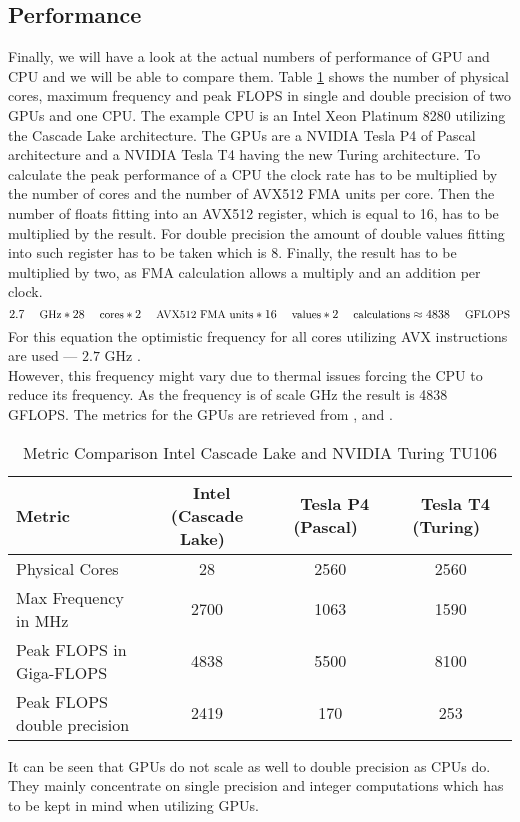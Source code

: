 \subsection{Performance}
  Finally, we will have a look at the actual numbers of performance of GPU and CPU and we will be able to compare them.
  Table \ref{tab:comp} shows the number of physical cores, maximum frequency and peak FLOPS in single and double precision of two GPUs and one CPU.
  The example CPU is an Intel Xeon Platinum 8280 utilizing the Cascade Lake architecture.
  The GPUs are a NVIDIA Tesla P4 of Pascal architecture and a NVIDIA Tesla T4 having the new Turing architecture.
  To calculate the peak performance of a CPU the clock rate has to be multiplied by the number of cores and the number of AVX512 FMA units per core.
  Then the number of floats fitting into an AVX512 register, which is equal to 16, has to be multiplied by the result.
  For double precision the amount of double values fitting into such register has to be taken which is 8.
  Finally, the result has to be multiplied by two, as FMA calculation allows a multiply and an addition per clock.
  \[2.7 \textrm{\small{ GHz}} * 28 \textrm{\small{ cores}} * 2 \textrm{\small{ AVX512 FMA units}} * 16 \textrm{\small{ values}} * 2 \textrm{\small{ calculations}} \approx 4838 \textrm{\small{ GFLOPS}}\]
  For this equation the optimistic frequency for all cores utilizing AVX instructions are used --- \(2.7\) GHz \cite{Microway}.\\
  However, this frequency might vary due to thermal issues forcing the CPU to reduce its frequency.
  As the frequency is of scale GHz the result is 4838 GFLOPS.
  The metrics for the GPUs are retrieved from \cite{NVIDIA.2018}, \cite{Keny2019} and \cite{GPZOO}.
  
\begin{table}[htbp]
  \centering
  \caption{Metric Comparison Intel Cascade Lake and NVIDIA Turing TU106}
  \label{tab:comp}
  \begin{tabular}{|l|c|c|c|}
    \hline
	\textbf{Metric} & \textbf{~Intel (Cascade Lake)~} & \textbf{~Tesla P4 (Pascal)~} & \textbf{~Tesla T4 (Turing)~} \\\hline
	Physical Cores & 28 & 2560 & 2560 \\\hline
	Max Frequency in MHz & 2700 & 1063 & 1590 \\\hline
	Peak FLOPS in Giga-FLOPS & 4838 & 5500 & 8100 \\\hline
	Peak FLOPS double precision & 2419 & 170 & 253 \\\hline
  \end{tabular}
\end{table}

  It can be seen that GPUs do not scale as well to double precision as CPUs do.
  They mainly concentrate on single precision and integer computations which has to be kept in mind when utilizing GPUs.